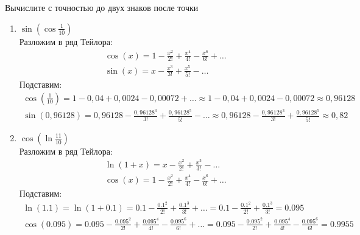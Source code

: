 
		\subsection{}Вычислите с точностью до двух знаков после точки
		\begin{enumerate}
		\item $\sin(\cos\frac{1}{10})$\\
			Разложим в ряд Тейлора:\\
			\begin{gather*}
				\cos(x) = 1 - \frac{x^{2}}{2!} + \frac{x^{4}}{4!} - \frac{x^{6}}{6!} + \ldots\\
				\sin(x) = x - \frac{x^{3}}{3!} + \frac{x^{5}}{5!} - \ldots
			\end{gather*}
			Подставим:\\
			\begin{gather*}
				\cos(\frac{1}{10}) = 1 - 0,04 + 0,0024 - 0,00072 + \ldots \approx 1 - 0,04 + 0,0024 - 0,00072 \approx 0,96128\\
				\sin(0,96128) = 0,96128 - \frac{0,96128^{3}}{3!} + \frac{0,96128^{5}}{5!} - \ldots \approx 0,96128 - \frac{0,96128^{3}}{3!} + \frac{0,96128^{5}}{5!} \approx 0,82
			\end{gather*}
			
		\item $\cos(\ln\frac{11}{10})$\\
			Разложим в ряд Тейлора:\\
			\begin{gather*}
				\ln(1 + x) = x - \frac{x^{2}}{2!} + \frac{x^{3}}{3!} - \ldots\\
				\cos(x) = 1 - \frac{x^{2}}{2!} + \frac{x^{4}}{4!} - \frac{x^{6}}{6!} + \ldots
			\end{gather*}
			Подставим:\\
			\begin{gather*}
				\ln(1.1) = \ln(1 + 0.1) = 0.1 - \frac{0.1^{2}}{2!} + \frac{0.1^{3}}{3!} + \ldots = 0.1 - \frac{0.1^{2}}{2!} + \frac{0.1^{3}}{3!} = 0.095\\
				\cos(0.095) = 0.095 - \frac{0.095^{2}}{2!} + \frac{0.095^{4}}{4!} - \frac{0.095^{6}}{6!} + \ldots = 0.095 - \frac{0.095^{2}}{2!} + \frac{0.095^{4}}{4!} - \frac{0.095^{6}}{6!} = 0.9955
			\end{gather*}		
		\end{enumerate}
		

